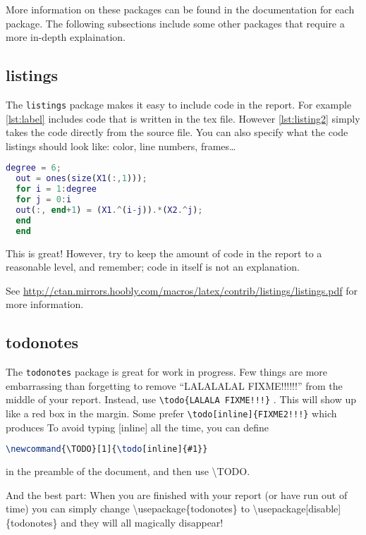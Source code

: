 More information on these packages can be found in the documentation for each package. The following subsections include some other packages that require a more in-depth explaination.

\subsection{listings}
The \texttt{listings} package makes it easy to include code in the report. For example \cref{lst:label} includes code that is written in the tex file. However \cref{lst:listing2} simply takes the code directly from the source file. You can also specify what the code listings should look like: color, line numbers, frames\ldots

\begin{lstlisting}[caption={Some Matlab code, with the source in the tex file},label={lst:label},language=Matlab, float]
  degree = 6;
  out = ones(size(X1(:,1)));
  for i = 1:degree
  for j = 0:i
  out(:, end+1) = (X1.^(i-j)).*(X2.^j);
  end
  end
\end{lstlisting}

This is great! However, try to keep the amount of code in the report to a reasonable level, and remember; code in itself is not an explanation.

See \url{http://ctan.mirrors.hoobly.com/macros/latex/contrib/listings/listings.pdf} for more information.

\subsection{todonotes}
The \texttt{todonotes} package is great for work in progress. Few things are more embarrassing than forgetting to remove ``LALALALAL FIXME!!!!!!'' from the middle of your report. Instead, use \texttt{\textbackslash{todo}\{LALALA FIXME!!!\}} . This will show up like a red box in the margin. Some prefer \texttt{\textbackslash{todo}{[inline]}\{FIXME2!!!\}} which produces  To avoid typing [inline] all the time, you can define
\begin{lstlisting}[language=TeX, numbers=none]
  \newcommand{\TODO}[1]{\todo[inline]{#1}}
\end{lstlisting}
in the preamble of the document, and then use \textbackslash{TODO}.

And the best part: When you are finished with your report (or have run out of time) you can simply change \textbackslash{usepackage}\{todonotes\} to \textbackslash{usepackage}[disable]\{todonotes\} and they will all magically disappear!

